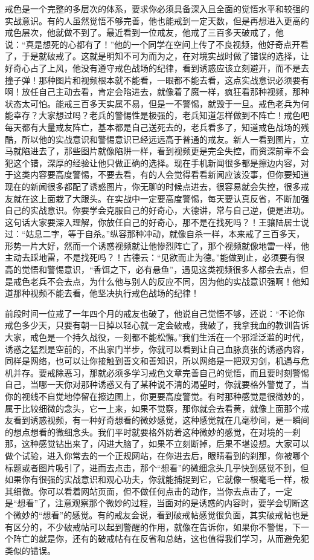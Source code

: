 戒色是一个完整的多层次的体系，要求你必须具备深入且全面的觉悟水平和较强的实战意识。有的人虽然觉悟不够完善，他也能戒到一定天数，但是再想进入更高的戒色层次，他就做不到了。最近看到一位戒友，他戒了三百多天破戒了，他说：“真是想死的心都有了！”他的一个同学在空间上传了不良视频，他好奇点开看了，于是就破戒了。这就是明知不可为而为之，在对境实战时做了错误的选择，让好奇心占了上风，他没有遵守戒色战场的纪律，看到诱惑应该立刻避开，而不是去撞子弹！那种图片和视频根本就不能看，一眼都不能去看，这点实战意识必须要有啊！放任自己主动去看，肯定会陷进去，就像着了魔一样，疯狂看那种视频，那种状态太可怕。能戒三百多天实属不易，但是一不警惕，就毁于一旦。戒色老兵为何能幸存？大家想过吗？老兵的警惕性是极强的，老兵知道怎样做到不阵亡！戒色吧每天都有大量戒友阵亡，基本都是自己送死去的，老兵看多了，知道戒色战场的残酷，所以他的实战意识和警惕意识已经远远高于普通的戒友。新人一看到图片，立马就陷进去了，那些图片就像陷阱一样，看到视频更是完全失控，而资深前辈不会犯这个错，深厚的经验让他只做正确的选择。现在手机新闻很多都是擦边内容，对于这类内容要高度警惕，不要去看，有的人会觉得看看新闻应该没事，但你要知道现在的新闻很多都配了诱惑图片，你无聊的时候点进去，很容易就会失控，很多戒友就在这上面栽了大跟头。在实战中一定要高度警惕，每天要认真反省，不断加强自己的实战意识。你要学会克服自己的好奇心，大德讲，常与自己逆，便是进功。这句话大家要深入理解，你放任自己的好奇心，那不是在找死吗？！王骧陆居士说过：“姑息二字，等于自杀。”纵容那种冲动，就像自杀一样，本来戒了三百多天，形势一片大好，然而一个诱惑视频就让他惨烈阵亡了，那个视频就像地雷一样，他主动去踩地雷，不是找死吗？！古德云：“见欲而止为德。”能做到止，必须要有很高的觉悟和警惕意识，“香饵之下，必有悬鱼”，遇见这类视频很多人都会去点，但是戒色老兵不会去点，为什么他与别人的反应不同，因为他的实战意识强啊！他知道那种视频不能去看，他坚决执行戒色战场的纪律！

前段时间一位戒了一年四个月的戒友也破了，他说自己觉悟不够，还说：“不论你戒色多少天，只要有朝一日掉以轻心就一定会破戒，我破了，我拿我血的教训告诉大家，戒色是一个持久战役，一刻都不能松懈。”我们生活在一个邪淫泛滥的时代，诱惑之猛烈是空前的，不出家门半步，你就可以看到让自己血脉贲张的诱惑内容，同样是网络，也可以让你接触到善文和善知识，所以网络是一把双刃剑，机遇与危机并存。要戒除恶习，那就必须多学习戒色文章完善自己的觉悟，而且要时刻警惕自己，当哪一天你对那种诱惑又有了某种说不清的渴望时，你就要格外警觉了，当你的视线不自觉地停留在擦边图上，你更要高度警觉。有时那种感觉是很微妙的，属于比较细微的念头，它一上来，如果不觉察，那你就会去看黄，就像上面那个戒友看到诱惑视频，有一种好奇想看的微妙感觉，这种感觉就在几毫秒间，是一瞬间的想点想看的微细念头。我们平时就要格外防着这种微妙的感觉，在对境的一刹那，这种感觉钻出来了，闪进大脑了，如果不立刻断掉，后果不堪设想。大家可以做个试验，进入你常去的一个正规网站，在你进去后，眼睛看到的刹那，你被哪个标题或者图片吸引了，进而去点击，那个“想看”的微细念头几乎快到感觉不到，但如果你有很强的实战意识和观心功夫，你就能捕捉到它，它就像一根毫毛一样，极其细微。你可以看着网站页面，但不做任何点击的动作，当你去点击了，一定是“想看”了，注意观察那个微妙的过程，当面对的是诱惑的内容时，要学会切断这个微妙的“想看”的感觉。有的戒友会说，看到破戒帖感觉很负面，其实破戒帖也是有区分的，不少破戒帖可以起到警醒的作用，就像在告诉你，如果你不警惕，下一个阵亡的就是你，还有的破戒帖有在反省和总结，这也值得我们学习，从而避免犯类似的错误。

